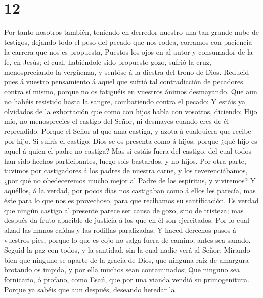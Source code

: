 \hypertarget{section-11}{%
\section{12}\label{section-11}}

 Por tanto nosotros también, teniendo en derredor nuestro
una tan grande nube de testigos, dejando todo el peso del pecado que nos
rodea, corramos con paciencia la carrera que nos es propuesta,
 Puestos los ojos en al autor y consumador de la fe, en
Jesús; el cual, habiéndole sido propuesto gozo, sufrió la cruz,
menospreciando la vergüenza, y sentóse á la diestra del trono de Dios.
 Reducid pues á vuestro pensamiento á aquel que sufrió tal
contradicción de pecadores contra sí mismo, porque no os fatiguéis en
vuestros ánimos desmayando.  Que aun no habéis resistido
hasta la sangre, combatiendo contra el pecado:  Y estáis ya
olvidados de la exhortación que como con hijos habla con vosotros,
diciendo: Hijo mío, no menosprecies el castigo del Señor, ni desmayes
cuando eres de él reprendido.  Porque el Señor al que ama
castiga, y azota á cualquiera que recibe por hijo.  Si
sufrís el castigo, Dios se os presenta como á hijos; porque ¿qué hijo es
aquel á quien el padre no castiga?  Mas si estáis fuera del
castigo, del cual todos han sido hechos participantes, luego sois
bastardos, y no hijos.  Por otra parte, tuvimos por
castigadores á los padres de nuestra carne, y los reverenciábamos, ¿por
qué no obedeceremos mucho mejor al Padre de los espíritus, y viviremos?
 Y aquéllos, á la verdad, por pocos días nos castigaban
como á ellos les parecía, mas éste para lo que nos es provechoso, para
que recibamos su santificación.  Es verdad que ningún
castigo al presente parece ser causa de gozo, sino de tristeza; mas
después da fruto apacible de justicia á los que en él son ejercitados.
 Por lo cual alzad las manos caídas y las rodillas
paralizadas;  Y haced derechos pasos á vuestros pies,
porque lo que es cojo no salga fuera de camino, antes sea sanado.
 Seguid la paz con todos, y la santidad, sin la cual nadie
verá al Señor:  Mirando bien que ninguno se aparte de la
gracia de Dios, que ninguna raíz de amargura brotando os impida, y por
ella muchos sean contaminados;  Que ninguno sea fornicario,
ó profano, como Esaú, que por una vianda vendió su primogenitura.
 Porque ya sabéis que aun después, deseando heredar la
